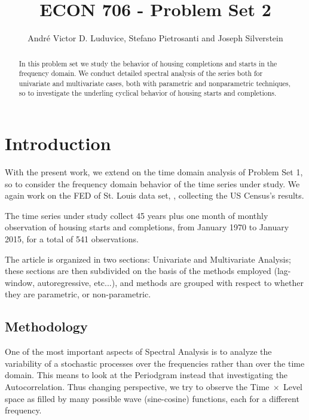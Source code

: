 \documentclass[12pt]{article} %
\begin{document}
\title{ECON 706 - Problem Set 2}
\author{Andr\'e Victor D. Luduvice, Stefano Pietrosanti and Joseph Silverstein}

\maketitle

\begin{abstract}
In this problem set we study the behavior of housing completions and starts in the frequency domain. We conduct detailed spectral analysis of the series both for univariate and multivariate cases, both with parametric and nonparametric techniques, so to investigate the underling cyclical behavior of housing starts and completions. 

\end{abstract}

\section{Introduction}

With the present work, we extend on the time domain analysis of Problem Set 1, so to consider the frequency domain behavior of the time series under study. We again work on the FED of St. Louis data set, \citep{dataset}, collecting the US Census's results.

The time series under study collect 45 years plus one month of monthly observation of housing starts and completions, from January 1970 to January 2015, for a total of 541 observations.

The article is organized in two sections: Univariate and Multivariate Analysis; these sections are then subdivided on the basis of the methods employed (lag-window, autoregressive, etc...), and methods are grouped with respect to whether they are parametric, or non-parametric.

\subsection{Methodology}

One of the most important aspects of Spectral Analysis is to analyze the variability of a stochastic processes over the frequencies rather than over the time domain. This means to look at the Periodgram instead that investigating the Autocorrelation. Thus changing perspective, we try to observe the Time$\;\times\;$Level space as filled by many possible wave (sine-cosine) functions, each for a different frequency.
\end{document}
